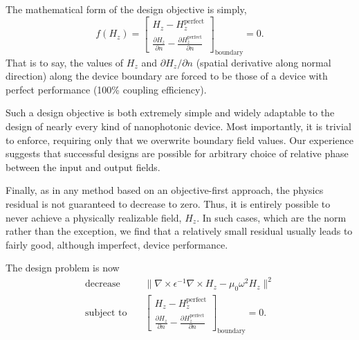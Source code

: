 \documentclass[letterpaper,10pt]{article}
\begin{document}
The mathematical form of the design objective is simply, 
    \begin{equation}
    f(H_z) = \begin{bmatrix}
        H_z - H_z^\text{perfect} \\
        \frac{\partial H_z}{\partial n} - 
            \frac{\partial H_z^\text{perfect}}{\partial n}
        \end{bmatrix}_\text{boundary}
        = 0.
    \end{equation}
That is to say,
    the values of $H_z$ and $\partial H_z / \partial n$
    (spatial derivative along normal direction)
    along the device boundary are forced to be 
    those of a device with perfect performance 
    (100\% coupling efficiency).
     
Such a design objective is both extremely simple and widely adaptable 
    to the design of nearly every kind of nanophotonic device.
Most importantly, it is trivial to enforce,
    requiring only that we overwrite boundary field values.
Our experience suggests that successful designs are possible for 
    arbitrary choice of relative phase between the input and output fields.

Finally, as in any method based on an objective-first approach,
    the physics residual is not guaranteed to decrease to zero.
Thus, it is entirely possible to never achieve 
    a physically realizable field, $H_z$.
In such cases, which are the norm rather than the exception,
    we find that a relatively small residual usually leads to
    fairly good, although imperfect, device performance.
    
The design problem is now
    \begin{subequations}\label{eq:act}
    \begin{align} 
    \text{decrease} & \quad  
        \| \nabla \times \epsilon^{-1} \nabla \times H_z - 
            \mu_0 \omega^2 H_z \|^2 \label{eq:act:obj} \\ 
    \text{subject to} & \quad 
        \begin{bmatrix}
        H_z - H_z^\text{perfect} \\
        \frac{\partial H_z}{\partial n} - 
            \frac{\partial H_z^\text{perfect}}{\partial n}
        \end{bmatrix}_\text{boundary}
        = 0.
    \end{align}
    \end{subequations}
\end{document}
